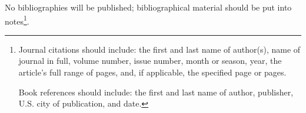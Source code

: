 \documentclass{jphilart}
\begin{document}
No bibliographies will be published; bibliographical
material should be put into notes\footnote{Journal citations should include:
the first and last name of author(s), name of journal in full, volume number,
issue number, month or season, year, the article's full range of pages, and,
if applicable, the specified page or pages.

Book references should include: the first and last name of author,
publisher, U.S. city of publication, and date.}.


\end{document}
